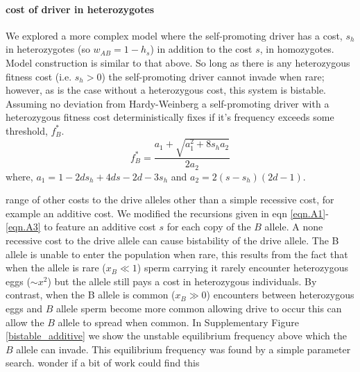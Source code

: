 \documentclass[12pt,letterpaper]{article}
\newcommand{\gc}[1]{{ \color{red} #1}}
\begin{document}
\paragraph{cost of driver in heterozygotes}
We explored a more complex model where the self-promoting driver has a cost, $s_h$ in heterozygotes (so $w_{AB} = 1-h_s$) in addition to the cost $s$, in homozygotes.
Model construction is similar to that above.
So long as there is any heterozygous fitness cost (i.e. $s_h > 0$) the self-promoting driver cannot invade when rare;
	however, as is the case without a heterozygous cost, this system is bistable.
Assuming no deviation from Hardy-Weinberg a self-promoting driver with a heterozygous fitness cost deterministically fixes if it's frequency exceeds some threshold, $f_B^*$.
\begin{equation}
	f_B^* = \frac{a_1+\sqrt{a_1^2+8 s_h a_2}}{2 a_2}
	\label{thresh2}
\end{equation}
where, $a_1=1-2 ds_h+4 d s-2 d-3 s_h$ and $a_2=2(s-s_h)(2d-1)$.
 
 range of other costs to the drive alleles other than a
simple recessive cost, for example an additive cost. We modified the recursions given in eqn
\ref{eqn.A1}-\ref{eqn.A3} to feature an additive cost $s$ for each
copy of the $B$ allele. A none recessive cost to the drive allele can
cause bistability of the drive allele. The B allele is unable to enter
the population when rare, this results from the fact that
when the allele is rare ($x_B \ll 1$) sperm carrying it rarely
encounter heterozygous eggs ($\sim x^2$) but the allele still pays a
cost in heterozygous individuals.  By contrast, when the B allele is common ($x_B
\gg 0$) encounters between heterozygous eggs and $B$ allele sperm
become more common allowing drive to occur this can allow the $B$
allele to spread when common. In Supplementary Figure
\ref{bistable_additive} we show the unstable equilibrium frequency
above which the $B$ allele can invade. This equilibrium frequency was found by a simple
parameter search.  \gc{wonder if a bit of work could find this}
\end{document}

